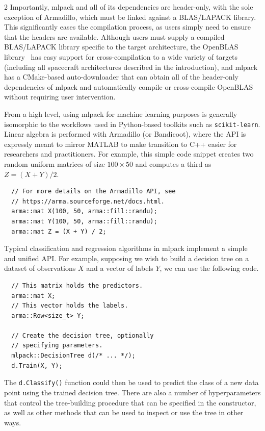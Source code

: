 \documentclass[10pt, fleqn]{article}
\begin{document}
\begin{multicols*}{2}
Importantly,
mlpack and all of its dependencies are header-only,
with the sole exception of Armadillo,
which must be linked against a BLAS/LAPACK library.
This significantly eases the compilation process,
as users simply need to ensure that the headers are available.
Although users must supply a compiled BLAS/LAPACK library
specific to the target architecture,
the OpenBLAS library~\cite{xianyi2012openblas} has easy support for cross-compilation
to a wide variety of targets
(including all spacecraft architectures described in the introduction),
and mlpack has a CMake-based auto-downloader that
can obtain all of the header-only dependencies of mlpack
and automatically compile or cross-compile OpenBLAS
without requiring user intervention.

From a high level,
using mlpack for machine learning purposes
is generally isomorphic to
the workflows used in Python-based toolkits such as {\small \tt scikit-learn}.
Linear algebra is performed with Armadillo (or Bandicoot),
where the API is expressly meant to mirror MATLAB
to make transition to C++ easier for researchers and practitioners.
For example, this simple code snippet creates
two random uniform matrices of size $100 \times 50$ and
computes a third as $Z = (X + Y) / 2$.

\begin{verbatim}
  // For more details on the Armadillo API, see
  // https://arma.sourceforge.net/docs.html.
  arma::mat X(100, 50, arma::fill::randu);
  arma::mat Y(100, 50, arma::fill::randu);
  arma::mat Z = (X + Y) / 2;
\end{verbatim}

Typical classification and regression algorithms in mlpack
implement a simple and unified API.
For example, supposing we wish to build a decision tree
on a dataset of observations $X$
and a vector of labels $Y$,
we can use the following code.

\begin{verbatim}
  // This matrix holds the predictors.
  arma::mat X;
  // This vector holds the labels.
  arma::Row<size_t> Y;

  // Create the decision tree, optionally
  // specifying parameters.
  mlpack::DecisionTree d(/* ... */);
  d.Train(X, Y);
\end{verbatim}

The {\small \tt d.Classify()} function could then be used to
predict the class of a new data point
using the trained decision tree.
There are also a number of hyperparameters that control the
tree-building procedure
that can be specified in the constructor,
as well as other methods that can be used to
inspect or use the tree in other ways.


\end{multicols*}
\end{document}
